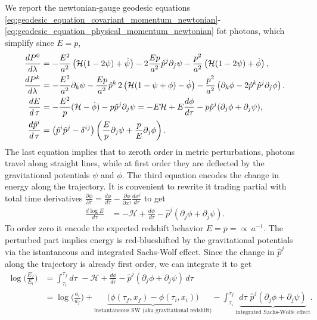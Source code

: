 We report the newtonian-gauge geodesic equations \eqref{eq:geodesic_equation_covariant_momentum_newtonian}-\eqref{eq:geodesic_equation_physical_momentum_newtonian} fot photons, which simplify since $E=p$,
\begin{align}\label{eq:geodesic_equations_photon_newtonian}
\begin{aligned}
    \frac{d P^0}{d\lambda}
    &= -\frac{E^2}{a^2}\left(\mathcal{H}(1-2\psi)+\dot\psi\right)-2\frac{Ep}{a^2}\hat{p}^j\partial_j\psi-\frac{p^2}{a^2}\left(\mathcal{H}(1-2\psi)+\dot\phi\right),
    \\
    \frac{dP^k}{d\lambda}&=-\frac{E^2}{a^2}\partial_k\psi-\frac{Ep}{a^2}\hat{p}^k\,2\left(\mathcal{H}(1-\psi+\phi)-\dot\phi\right)-\frac{p^2}{a^2}\left(\partial_k\phi-2\hat{p}^k\hat{p}^j\partial_j\phi\right).
    \\
    \frac{d E}{d\operatorname{\tau}}&=-\frac{E^2}{p}(\mathcal{H}-\dot\phi)-p\hat{p}^j\partial_j\psi = -E\mathcal{H}+E\frac{d\phi}{d\tau}-p\hat{p}^j(\partial_j\phi+\partial_j\psi),
    \\
    \frac{d\hat{p}^i}{d\operatorname{\tau}}&=\big(\hat{p}^i\hat{p}^j-\delta^{ij}\big)\left(\frac{E}{p}\partial_j\psi+\frac{p}{E}\partial_j\phi\right).
\end{aligned}
\end{align}
The last equation implies that to zeroth order in metric perturbations, photons travel along straight lines, while at first order they are deflected by the gravitational potentials $\psi$ and $\phi$.
The third equation encodes the change in energy along the trajectory.
It is convenient to rewrite it trading partial with total time derivatives $\frac{\partial \phi}{\partial \tau}=\frac{d\phi}{d\tau}-\frac{\partial \phi}{\partial x^j}\frac{dx^j}{d\tau}$ to get
{\small
\begin{align}
    \frac{d \log E}{d\tau}&= -\mathcal{H}+\frac{d\phi}{d\tau}-\hat{p}^j(\partial_j\phi+\partial_j\psi).
\end{align}}
To order zero it encode the expected redshift behavior $E=p=\propto\, a^{-1}$.
The perturbed part implies energy is red-blueshifted by the gravitational potentials via the istantaneous and integrated Sachs-Wolf effect.
Since the change in $\hat{p}^j$ along the trajectory is already first order, we can integrate it to get
{\small
\begin{align}
    \log \Big(\frac{E_f}{E_i}\Big) &= \int_{\tau_i}^{\tau_f} d\tau\,\, -\mathcal{H} + \frac{d\phi}{d\tau} - \hat{p}^j(\partial_j\phi+\partial_j\psi) \, d\tau\\
    &= \log \Big(\frac{a_i}{a_f}\Big) + \underbrace{\big(\phi(\tau_f,x_f)-\phi(\tau_i,x_i)\big)}_{\text{instantaneous SW (aka gravitational redshift)}} - \int_{\tau_i}^{\tau_f} \underbrace{d\tau\,\, \hat{p}^j(\partial_j\phi+\partial_j\psi)}_{\text{integrated Sachs-Wolfe effect}}.
\end{align}}
